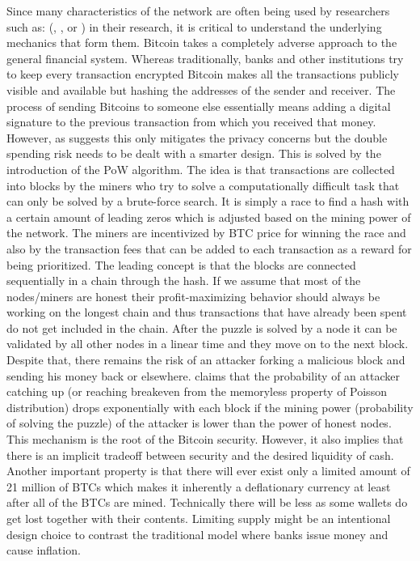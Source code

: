Since many characteristics of the network are often being used by researchers such as: 
(\cite{Kukacka2023}, \cite{Kristoufek2023}, \cite{Kubal2022} or \cite{Jay2020}) 
in their research, it is critical to understand the underlying mechanics that form them.
Bitcoin takes a completely adverse approach to the general financial system. Whereas traditionally,
banks and other institutions try to keep every transaction encrypted Bitcoin makes all the 
transactions publicly visible and available but hashing the addresses of the sender and receiver.
The process of sending Bitcoins to someone else essentially means adding a digital signature to the
previous transaction from which you received that money. 
However, as \cite[see Chapter 2][pg.~2]{Nakamoto2008} suggests this only mitigates the privacy concerns
but the double spending risk needs to be dealt with a smarter design.
This is solved by the introduction of the \ac{PoW} algorithm. The idea is that
transactions are collected into blocks by the miners who try to solve a computationally difficult 
task that can only be solved by a brute-force search. It is simply a race to find a hash with a 
certain amount of leading zeros which is adjusted based on the mining power of the network.  
The miners are incentivized by \acs{BTC} price for winning the race and also by the transaction
fees that can be added to each transaction as a reward for being prioritized. 
The leading concept is that the blocks are connected sequentially in a chain through the hash.
If we assume that most of the nodes/miners are honest their profit-maximizing behavior should always be
working on the longest chain and thus transactions that have already been spent do not get included
in the chain. After the puzzle is solved by a node it can be validated by all other nodes
in a linear time and they move on to the next block. Despite that, there remains the risk of 
an attacker forking a malicious block and sending his money back or elsewhere. \cite{Nakamoto2008}
claims that the probability of an attacker catching up (or reaching breakeven from
the memoryless property of Poisson distribution) drops exponentially
with each block if the mining power (probability of solving the puzzle) of the
attacker is lower than the power of honest nodes. This mechanism is the root of the Bitcoin
security. However, it also implies that there is an implicit tradeoff between security and the
desired liquidity of cash. Another important property is that there will ever exist only a limited amount
of 21 million of \ac{BTC}s  which makes it inherently a deflationary currency at least
after all of the \ac{BTC}s are mined. Technically there will be less
as some wallets do get lost together with their contents. Limiting supply 
might be an intentional design choice
to contrast the traditional model where banks issue money and cause inflation.


